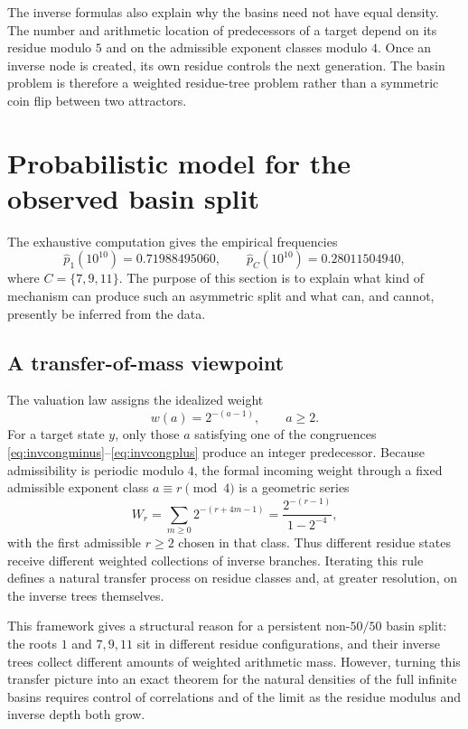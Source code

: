 \documentclass[11pt]{article}
\begin{document}
The inverse formulas also explain why the basins need not have equal density.  The number and arithmetic location of predecessors of a target depend on its residue modulo $5$ and on the admissible exponent classes modulo $4$.  Once an inverse node is created, its own residue controls the next generation.  The basin problem is therefore a weighted residue-tree problem rather than a symmetric coin flip between two attractors.

\section{Probabilistic model for the observed basin split}

The exhaustive computation gives the empirical frequencies
\[
\widehat p_1(10^{10})=0.71988495060,
\qquad
\widehat p_C(10^{10})=0.28011504940,
\]
where $C=\{7,9,11\}$.  The purpose of this section is to explain what kind of mechanism can produce such an asymmetric split and what can, and cannot, presently be inferred from the data.

\subsection{A transfer-of-mass viewpoint}

The valuation law assigns the idealized weight
\[
w(a)=2^{-(a-1)},\qquad a\ge2.
\]
For a target state $y$, only those $a$ satisfying one of the congruences \eqref{eq:invcongminus}--\eqref{eq:invcongplus} produce an integer predecessor.  Because admissibility is periodic modulo $4$, the formal incoming weight through a fixed admissible exponent class $a\equiv r\pmod4$ is a geometric series
\begin{equation}
W_r
=
\sum_{m\ge0}2^{-(r+4m-1)}
=
\frac{2^{-(r-1)}}{1-2^{-4}},
\label{eq:classweight}
\end{equation}
with the first admissible $r\ge2$ chosen in that class.  Thus different residue states receive different weighted collections of inverse branches.  Iterating this rule defines a natural transfer process on residue classes and, at greater resolution, on the inverse trees themselves.

This framework gives a structural reason for a persistent non-$50/50$ basin split: the roots $1$ and $7,9,11$ sit in different residue configurations, and their inverse trees collect different amounts of weighted arithmetic mass.  However, turning this transfer picture into an exact theorem for the natural densities of the full infinite basins requires control of correlations and of the limit as the residue modulus and inverse depth both grow.
\end{document}
